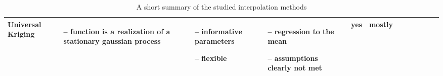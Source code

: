 \begin{table}[!ht]
\begin{tabular}{p{1.6cm}p{3.3cm}p{3.3cm}p{3.3cm}p{0.4cm}p{0.4cm}p{3cm}p{3cm}p{3cm}p{3cm}p{3cm}p{3cm}|}
		Universal Kriging                                                                                                                                            &
		\begin{cptitemize} \item[--]  function is a realization of a stationary gaussian process                                      \end{cptitemize}               &
		\begin{cptitemize} \item[--]  informative parameters \item[--]  flexible                                                             \end{cptitemize}        &
		\begin{cptitemize} \item[--]  regression to the mean \item[--]  assumptions clearly not met                                          \end{cptitemize}        &
		yes                                                                                                                                                          &
		mostly                                                                                                                                                         \\ \hline%


		\hline
	\end{tabular}
	\caption[skip=10pt]{A short summary of the studied interpolation methods}
	\label{table:pros_cons_overview}
\end{table}
